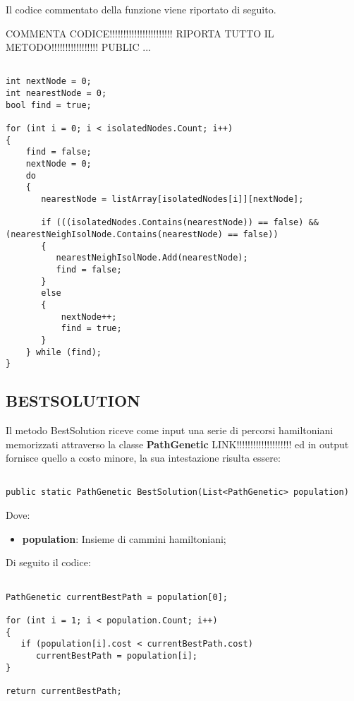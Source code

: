 \documentclass[11pt]{article}
\begin{document}
Il codice commentato della funzione viene riportato di seguito.

COMMENTA CODICE!!!!!!!!!!!!!!!!!!!!!!! RIPORTA TUTTO IL METODO!!!!!!!!!!!!!!!!! PUBLIC ...

\begin{lstlisting}

int nextNode = 0;
int nearestNode = 0;
bool find = true;

for (int i = 0; i < isolatedNodes.Count; i++)
{
    find = false;
    nextNode = 0;
    do
    {
       nearestNode = listArray[isolatedNodes[i]][nextNode];

       if (((isolatedNodes.Contains(nearestNode)) == false) && (nearestNeighIsolNode.Contains(nearestNode) == false))
       {
          nearestNeighIsolNode.Add(nearestNode);
          find = false;
       }
       else
       {
           nextNode++;
           find = true;
       }
    } while (find);
}

\end{lstlisting}

\subsection*{BESTSOLUTION}
\label{sec:BestSolutionS}

Il metodo BestSolution riceve come input una serie di percorsi hamiltoniani memorizzati attraverso la classe \textbf{PathGenetic} LINK!!!!!!!!!!!!!!!!!!!! ed in output fornisce quello a costo minore, la sua intestazione risulta essere:

\begin{lstlisting}

public static PathGenetic BestSolution(List<PathGenetic> population)

\end{lstlisting}

Dove:

\begin{itemize}
    \item \textbf{population}: Insieme di cammini hamiltoniani;
\end{itemize}

Di seguito il codice:

\begin{lstlisting}

PathGenetic currentBestPath = population[0];

for (int i = 1; i < population.Count; i++)
{
   if (population[i].cost < currentBestPath.cost)
      currentBestPath = population[i];
}

return currentBestPath;

\end{lstlisting}
\end{document}
